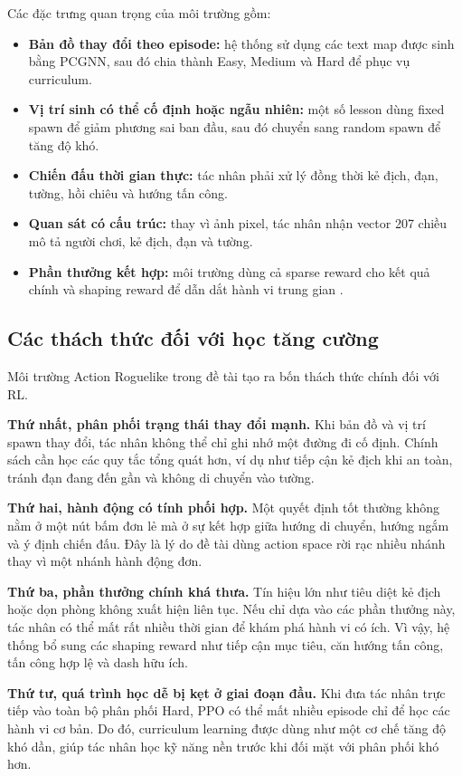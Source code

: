 Các đặc trưng quan trọng của môi trường gồm:

\begin{itemize}
    \item \textbf{Bản đồ thay đổi theo episode:} hệ thống sử dụng các text map được sinh bằng PCGNN, sau đó chia thành Easy, Medium và Hard để phục vụ curriculum.
    \item \textbf{Vị trí sinh có thể cố định hoặc ngẫu nhiên:} một số lesson dùng fixed spawn để giảm phương sai ban đầu, sau đó chuyển sang random spawn để tăng độ khó.
    \item \textbf{Chiến đấu thời gian thực:} tác nhân phải xử lý đồng thời kẻ địch, đạn, tường, hồi chiêu và hướng tấn công.
    \item \textbf{Quan sát có cấu trúc:} thay vì ảnh pixel, tác nhân nhận vector 207 chiều mô tả người chơi, kẻ địch, đạn và tường.
    \item \textbf{Phần thưởng kết hợp:} môi trường dùng cả sparse reward cho kết quả chính và shaping reward để dẫn dắt hành vi trung gian \cite{Ibrahim2024}.
\end{itemize}

\subsection{Các thách thức đối với học tăng cường}

Môi trường Action Roguelike trong đề tài tạo ra bốn thách thức chính đối với RL.

\textbf{Thứ nhất, phân phối trạng thái thay đổi mạnh.} Khi bản đồ và vị trí spawn thay đổi, tác nhân không thể chỉ ghi nhớ một đường đi cố định. Chính sách cần học các quy tắc tổng quát hơn, ví dụ như tiếp cận kẻ địch khi an toàn, tránh đạn đang đến gần và không di chuyển vào tường.

\textbf{Thứ hai, hành động có tính phối hợp.} Một quyết định tốt thường không nằm ở một nút bấm đơn lẻ mà ở sự kết hợp giữa hướng di chuyển, hướng ngắm và ý định chiến đấu. Đây là lý do đề tài dùng action space rời rạc nhiều nhánh thay vì một nhánh hành động đơn.

\textbf{Thứ ba, phần thưởng chính khá thưa.} Tín hiệu lớn như tiêu diệt kẻ địch hoặc dọn phòng không xuất hiện liên tục. Nếu chỉ dựa vào các phần thưởng này, tác nhân có thể mất rất nhiều thời gian để khám phá hành vi có ích. Vì vậy, hệ thống bổ sung các shaping reward như tiếp cận mục tiêu, căn hướng tấn công, tấn công hợp lệ và dash hữu ích.

\textbf{Thứ tư, quá trình học dễ bị kẹt ở giai đoạn đầu.} Khi đưa tác nhân trực tiếp vào toàn bộ phân phối Hard, PPO có thể mất nhiều episode chỉ để học các hành vi cơ bản. Do đó, curriculum learning được dùng như một cơ chế tăng độ khó dần, giúp tác nhân học kỹ năng nền trước khi đối mặt với phân phối khó hơn.

